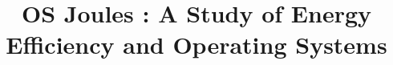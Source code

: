 \usepackage{usenix}
\usepackage{graphics}
\usepackage{cleveref}
\usepackage{titling}
\usepackage{trackchanges}
\usepackage{subcaption}
\usepackage{tikz}
\usepackage{amsmath}
\usepackage{adjcalc}
\usepackage{adjustbox}
\usepackage{breakurl}
\usepackage{collectbox}
\usepackage{couriers}
\usepackage{etoolbox}
\usepackage{flushend}
\usepackage{hyphenat}
\usepackage{multirow}
\usepackage{SIunits}
\usepackage{wrapfig}
\usepackage{float}
\usepackage{multirow}
\usepackage{xargs}     %
\usepackage{xcolor}  %
% 
\usepackage{graphicx}
\usepackage{subcaption}
\usepackage{paralist}
\usepackage[]{todonotes}
\usepackage{cleveref}




\date{}
\title{\Large \bf OS Joules : A Study of Energy Efficiency and Operating
Systems}


\maketitle

